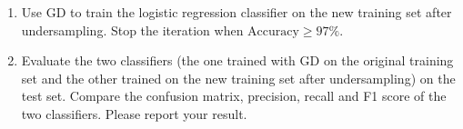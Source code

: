 \documentclass[11pt,letter,notitlepage]{article}
\begin{document}
\begin{exercise}
\begin{enumerate}
\begin{enumerate}
    \item Use GD to train the logistic regression classifier on the new training set after undersampling. Stop the iteration when $\text{Accuracy}\geq 97\%$.
    \item Evaluate the two classifiers (the one trained with GD on the original training set and the other trained on the new training set after undersampling) on the test set. Compare the confusion matrix, precision, recall and F1 score of the two classifiers. Please report your result.
\end{enumerate}

\end{enumerate}
\end{exercise}
\begin{solution}
\end{solution}


\end{document}
